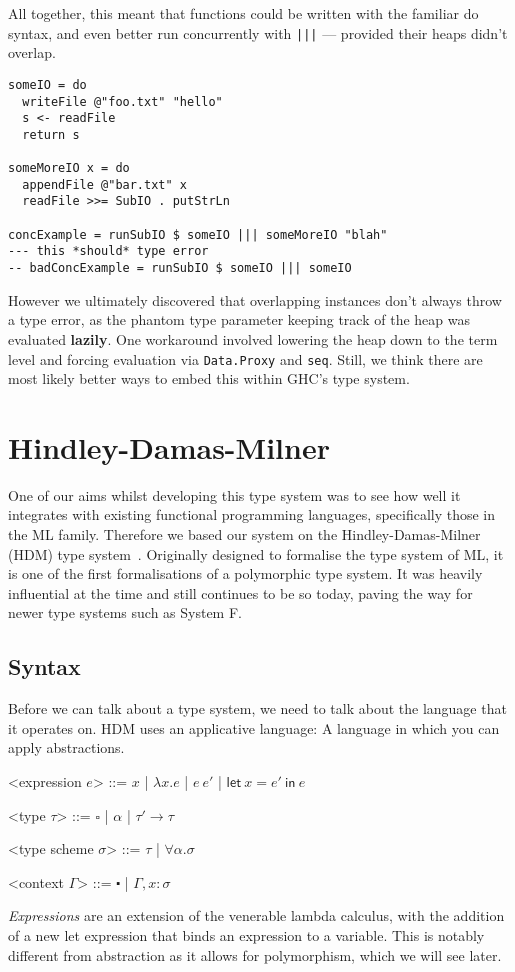 All together, this meant that functions could be written with the
familiar do syntax, and even better run concurrently with
\texttt{|||} --- provided their heaps didn't overlap.
\begin{verbatim}
someIO = do
  writeFile @"foo.txt" "hello"
  s <- readFile
  return s

someMoreIO x = do
  appendFile @"bar.txt" x
  readFile >>= SubIO . putStrLn

concExample = runSubIO $ someIO ||| someMoreIO "blah"
--- this *should* type error
-- badConcExample = runSubIO $ someIO ||| someIO
\end{verbatim}
However we ultimately discovered that overlapping instances don't
always throw a type error, as the phantom type parameter keeping track
of the heap was evaluated \textbf{lazily}. One workaround involved
lowering the heap down to the term level and forcing evaluation via
\texttt{Data.Proxy} and \texttt{seq}. Still,
we think there are most likely better ways to embed this within GHC's
type system.

\section{Hindley-Damas-Milner}
One of our aims whilst developing this type system was to see how well
it integrates with existing functional programming languages,
specifically those in the ML family. Therefore we based our system on
the Hindley-Damas-Milner (HDM) type
system~\cite{damas1982}. Originally designed to formalise the type
system of ML, it is one of the first formalisations of a polymorphic
type system. It was heavily influential at the time and still
continues to be so today, paving the way for newer type systems such
as System F.

\subsection{Syntax}
Before we can talk about a type system, we need to talk about the
language that it operates on. HDM uses an applicative language: A
language in which you can apply abstractions.
\def\defaultHypSeparation{\hskip .05in}
\newcommand{\letin}[2]{\mathsf{let} \ #1 \ \mathsf{in} \ #2}
\begin{grammar}
  <expression $e$> ::= $x$ | $\lambda x . e$ | $e \ e'$ | $\letin{x=e'}{e}$ %

  <type $\tau$> ::= $\square$ | $\alpha$ | $\tau' \rightarrow \tau$
  
  <type scheme $\sigma$> ::= $\tau$ | $\forall \alpha . \sigma$

  <context $\Gamma$> ::= $\centerdot$ | $\Gamma, x : \sigma$
\end{grammar}
\emph{Expressions} are an extension of the venerable lambda calculus, with
the addition of a new let expression that binds an expression to a
variable. This is notably different from abstraction as it allows for
polymorphism, which we will see later.

